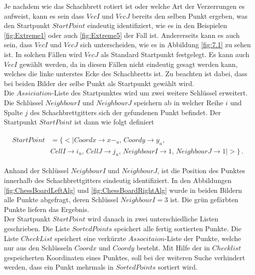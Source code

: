 Je nachdem wie das Schachbrett rotiert ist oder welche Art der Verzerrungen es aufweist, kann es sein dass $VecI$ und $VecJ$ bereits den selben Punkt ergeben, was den Startpunkt $StartPoint$ eindeutig identifiziert, wie es in den Beispielen \ref{fig:Extreme1} oder auch \ref{fig:Extreme5} der Fall ist. Andererseits kann es auch sein, dass $VecI$ und $VecJ$ sich unterscheiden, wie es in Abbildung \ref{fig:7.1} zu sehen ist. In solchen Fällen wird $VecJ$ als Standard Startpunkt festgelegt. Es kann auch $VecI$ gewählt werden, da in diesen Fällen nicht eindeutig gesagt werden kann, welches die linke unterstes Ecke des Schachbretts ist. Zu beachten ist dabei, dass bei beiden Bilder der selbe Punkt als Startpunkt gewählt wird.\\

Die $Assiciation$-Liste des Startpunktes wird um zwei weitere Schlüssel erweitert. Die Schlüssel $NeighbourI$ und $NeighbourJ$ speichern ab in welcher Reihe $i$ und Spalte $j$ des Schachbrettgitters sich der gefundenen Punkt befindet. Der Startpunkt $StartPoint$ ist dann wie folgt definiert


\begin{gather*}
	\begin{split}
			StartPoint &= \{ <|Coordx \rightarrow x-_u,\, Coordy \rightarrow y_u,\, \\
			&CellI \rightarrow i_u,\, CellJ \rightarrow j_u,\,
			NeighbourI \rightarrow 1, \,NeighbourJ \rightarrow 1 |>\}\, .
	\end{split} 
\end{gather*}
 
Anhand der Schlüssel $NeighbourI$ und $NeighbourJ$, ist die Position des Punktes innerhalb des Schachbrettgitters eindeutig identifiziert. In den Abbildungen \ref{fig:ChessBoardLeftAlg} und \ref{fig:ChessBoardRightAlg} wurde in beiden Bildern alle Punkte abgefragt, deren Schlüssel $NeighbourI = 3$ ist. Die grün gefärbten Punkte liefern das Ergebnis. \\

Der Startpunkt $StartPoint$ wird danach in zwei unterschiedliche Listen geschrieben. Die Liste $SortedPoints$ speichert alle fertig sortierten Punkte. Die Liste $CheckList$ speichert eine verkürzte $Associtaion$-Liste der Punkte, welche nur aus den Schlüsseln $Coordx$ und $Coordy$ besteht. 
\pagebreak
Mit Hilfe der in $Checklist$ gespeicherten Koordinaten eines Punktes, soll bei der weiteren Suche verhindert werden, dass ein Punkt mehrmals in $SortedPoints$ sortiert wird.\\




